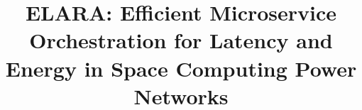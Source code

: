 \documentclass[10pt, conference, letterpaper]{IEEEtran}
\begin{document}
\title{ELARA: Efficient Microservice Orchestration for Latency and Energy in Space Computing Power Networks
}

\author{}

\maketitle 

\begin{abstract}

\end{abstract}
\end{document}
